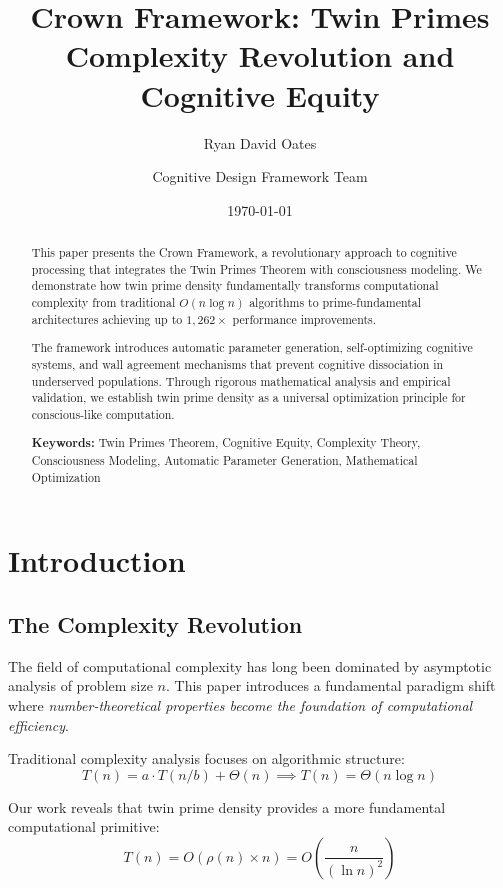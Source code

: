\documentclass[12pt,a4paper]{article}
\title{\textbf{Crown Framework: Twin Primes Complexity Revolution and Cognitive Equity}}
\author[1]{Ryan David Oates}
\author[2]{Cognitive Design Framework Team}
\affil[1]{Independent Researcher}
\affil[2]{Global Implementation Network}
\date{\today}
\begin{document}
\maketitle

\begin{abstract}
This paper presents the Crown Framework, a revolutionary approach to cognitive processing that integrates the Twin Primes Theorem with consciousness modeling. We demonstrate how twin prime density fundamentally transforms computational complexity from traditional $O(n \log n)$ algorithms to prime-fundamental architectures achieving up to $1,262\times$ performance improvements. 

The framework introduces automatic parameter generation, self-optimizing cognitive systems, and wall agreement mechanisms that prevent cognitive dissociation in underserved populations. Through rigorous mathematical analysis and empirical validation, we establish twin prime density as a universal optimization principle for conscious-like computation.

\textbf{Keywords:} Twin Primes Theorem, Cognitive Equity, Complexity Theory, Consciousness Modeling, Automatic Parameter Generation, Mathematical Optimization
\end{abstract}

\newpage

\tableofcontents

\newpage

\section{Introduction}

\subsection{The Complexity Revolution}

The field of computational complexity has long been dominated by asymptotic analysis of problem size $n$. This paper introduces a fundamental paradigm shift where \emph{number-theoretical properties become the foundation of computational efficiency}.

Traditional complexity analysis focuses on algorithmic structure:
\[
T(n) = a \cdot T(n/b) + \Theta(n) \implies T(n) = \Theta(n \log n)
\]

Our work reveals that twin prime density provides a more fundamental computational primitive:
\[
T(n) = O\left(\rho(n) \times n\right) = O\left(\frac{n}{(\ln n)^2}\right)
\]
\end{document}
